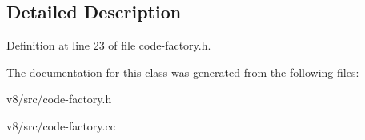 \subsection{Detailed Description}


Definition at line 23 of file code-\/factory.\+h.



The documentation for this class was generated from the following files\+:\begin{DoxyCompactItemize}
\item 
v8/src/code-\/factory.\+h\item 
v8/src/code-\/factory.\+cc\end{DoxyCompactItemize}
